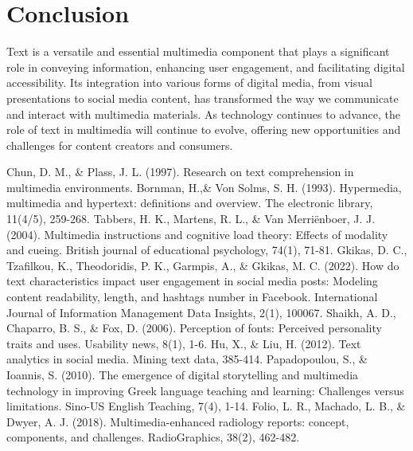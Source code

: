 \documentclass[12pt]{report}
\begin{document}
\newpage
\section*{Conclusion}
Text is a versatile and essential multimedia component that plays a significant role in conveying information, enhancing user engagement, and facilitating digital accessibility. Its integration into various forms of digital media, from visual presentations to social media content, has transformed the way we communicate and interact with multimedia materials. As technology continues to advance, the role of text in multimedia will continue to evolve, offering new opportunities and challenges for content creators and consumers.


\newpage
\renewcommand{\bibname}{References}
\begin{thebibliography}{}
    Chun, D. M., \& Plass, J. L. (1997). Research on text comprehension in multimedia environments.
    Bornman, H.,\& Von Solms, S. H. (1993). Hypermedia, multimedia and hypertext: definitions and overview. The electronic library, 11(4/5), 259-268.
    Tabbers, H. K., Martens, R. L., \& Van Merriënboer, J. J. (2004). Multimedia instructions and cognitive load theory: Effects of modality and cueing. British journal of educational psychology, 74(1), 71-81.
    Gkikas, D. C., Tzafilkou, K., Theodoridis, P. K., Garmpis, A., \& Gkikas, M. C. (2022). How do text characteristics impact user engagement in social media posts: Modeling content readability, length, and hashtags number in Facebook. International Journal of Information Management Data Insights, 2(1), 100067.
    Shaikh, A. D., Chaparro, B. S., \& Fox, D. (2006). Perception of fonts: Perceived personality traits and uses. Usability news, 8(1), 1-6.
    Hu, X., \& Liu, H. (2012). Text analytics in social media. Mining text data, 385-414.
    Papadopoulou, S., \& Ioannis, S. (2010). The emergence of digital storytelling and multimedia technology in improving Greek language teaching and learning: Challenges versus limitations. Sino-US English Teaching, 7(4), 1-14.
    Folio, L. R., Machado, L. B., \& Dwyer, A. J. (2018). Multimedia-enhanced radiology reports: concept, components, and challenges. RadioGraphics, 38(2), 462-482.
\end{thebibliography}
\end{document}

